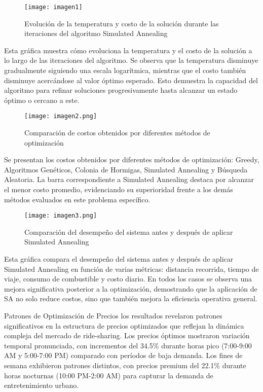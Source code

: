 \documentclass[conference]{IEEEtran}
\begin{document}
\begin{figure}[h!]
\centering
\texttt{[image: imagen1]}
\caption{Evolución de la temperatura y costo de la solución durante las iteraciones del algoritmo Simulated Annealing}
\end{figure}

Esta gráfica muestra cómo evoluciona la temperatura y el costo de la solución a lo largo de las iteraciones del algoritmo. Se observa que la temperatura disminuye gradualmente siguiendo una escala logarítmica, mientras que el costo también disminuye acercándose al valor óptimo esperado. Esto demuestra la capacidad del algoritmo para refinar soluciones progresivamente hasta alcanzar un estado óptimo o cercano a este.

\begin{figure}[h!]
\centering
\texttt{[image: imagen2.png]}
\caption{Comparación de costos obtenidos por diferentes métodos de optimización}
\end{figure}

Se presentan los costos obtenidos por diferentes métodos de optimización: Greedy, Algoritmos Genéticos, Colonia de Hormigas, Simulated Annealing y Búsqueda Aleatoria. La barra correspondiente a Simulated Annealing destaca por alcanzar el menor costo promedio, evidenciando su superioridad frente a los demás métodos evaluados en este problema específico.

\begin{figure}[h!]
\centering
\texttt{[image: imagen3.png]}
\caption{Comparación del desempeño del sistema antes y después de aplicar Simulated Annealing}
\end{figure}

Esta gráfica compara el desempeño del sistema antes y después de aplicar Simulated Annealing en función de varias métricas: distancia recorrida, tiempo de viaje, consumo de combustible y costo diario. En todos los casos se observa una mejora significativa posterior a la optimización, demostrando que la aplicación de SA no solo reduce costos, sino que también mejora la eficiencia operativa general.

Patrones de Optimización de Precios los resultados revelaron patrones significativos en la estructura de precios optimizados que reflejan la dinámica compleja del mercado de ride-sharing. Los precios óptimos mostraron variación temporal pronunciada, con incrementos del 34.5\% durante horas pico (7:00-9:00 AM y 5:00-7:00 PM) comparado con períodos de baja demanda. Los fines de semana exhibieron patrones distintos, con precios premium del 22.1\% durante horas nocturnas (10:00 PM-2:00 AM) para capturar la demanda de entretenimiento urbano.
\end{document}
